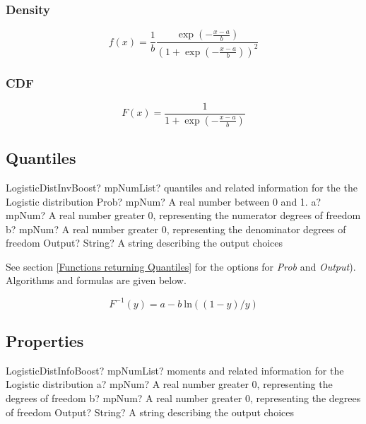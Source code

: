 \subsubsection{Density}
\label{LogisticDistributionDensity}

\begin{equation} 
	f(x)= \frac{1}{b} \frac{\exp \left(-\frac{x-a}{b}\right)}{\left(1+\exp \left(-\frac{x-a}{b}\right)\right)^2}
\end{equation}


\subsubsection{CDF}
\label{LogisticDistributionCDF}

\begin{equation} 
	F(x)= \frac{1}{1+\exp \left(-\frac{x-a}{b}\right)}
\end{equation}


\subsection{Quantiles}
\begin{mpFunctionsExtract}
	\mpFunctionFourNotImplemented
	{LogisticDistInvBoost? mpNumList? quantiles and related information for the the Logistic distribution}
	{Prob? mpNum? A real number between 0 and 1.}
	{a? mpNum? A real number greater 0, representing the numerator  degrees of freedom}
	{b? mpNum? A real number greater 0, representing the denominator degrees of freedom}
	{Output? String? A string describing the output choices}
\end{mpFunctionsExtract}

See section \ref{Functions returning Quantiles} for the options for  {\itshape\sffamily Prob} and {\itshape\sffamily Output}). Algorithms and formulas are given below.

\begin{equation} 
	F^{-1}(y)= a-b \: \text{ln}\left((1-y)/y\right)
\end{equation}



\subsection{Properties}
\label{LogisticDistributionProperties}

\begin{mpFunctionsExtract}
	\mpFunctionThreeNotImplemented
	{LogisticDistInfoBoost? mpNumList? moments and related information for the Logistic distribution}
	{a? mpNum? A real number greater 0, representing the degrees of freedom}
	{b? mpNum? A real number greater 0, representing the degrees of freedom}
	{Output? String? A string describing the output choices}
\end{mpFunctionsExtract}

